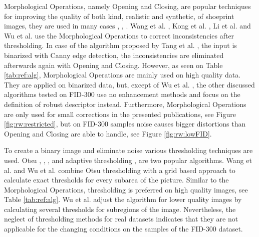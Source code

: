 \documentclass[draft,final]{vutinfth} %
\begin{document}
\par
Morphological Operations, namely Opening and Closing, are popular techniques for improving the quality of both kind, realistic and synthetic, of shoeprint images, they are  used in many cases \cite{wang2014automatic}, \cite{kong2014novel}, \cite{li2014retrieval}.
Wang et al. \cite{wang2014automatic}, Kong et al.  \cite{kong2014novel}, Li et al. \cite{li2014retrieval} and  Wu et al. \cite{wu2019crime}use the Morphological Operations to correct inconsistencies after thresholding.
In case of the algorithm proposed by Tang et al. \cite{tang2010footwear}, the input is binarized with Canny edge detection, the inconsistencies are eliminated afterwards again with Opening and Closing.
However, as seen on Table \ref{tab:ref:alg}, Morphological Operations are mainly used on high quality data.
They are applied on binarized data, but, except of Wu et al. \cite{wu2019crime}, the other discussed algorithms tested on FID-300 use no enhancement methods and focus on the definition of robust descriptor instead.
Furthermore, Morphological Operations are only used for small corrections in the presented publications, see Figure \ref{fig:rw:restricted}, but on FID-300 samples noise causes bigger distortions than Opening and Closing are able to handle, see Figure \ref{fig:rw:lowFID}.
\par
To create a binary image and eliminate noise various thresholding techniques are used.
Otsu  \cite{wu2019crime}, \cite{algarni2008novel}, \cite{alizadeh2017automatic}, \cite{kong2014novel} and adaptive thresholding \cite{wang2014automatic}, \cite{li2014retrieval} are two popular algorithms.
Wang et al. \cite{wang2014automatic} and Wu et al. \cite{wu2019crime} combine Otsu thresholding with a grid based approach to calculate exact thresholds for every subarea of the picture.
Similar to the Morphological Operations, thresholding is preferred on high quality images, see Table \ref{tab:ref:alg}.
Wu et al. \cite{wu2019crime} adjust the algorithm for lower quality images by calculating several thresholds for subregions of the image.
Nevertheless, the neglect of thresholding methods for real datasets indicates that they are not applicable for the changing conditions on the samples of the FID-300 dataset.
\end{document}
